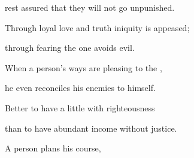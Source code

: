 {\par }{\Q rest assured
that they will not
go unpunished.
\par }{\Q {}Through loyal love
and truth
iniquity
is appeased;
\par }{\Q through fearing
the {}
one avoids
evil.
\par }{\Q {}When a person’s
ways
are pleasing
to the
{},

\par }{\Q he even
reconciles
his enemies
to himself.
\par }{\Q {}Better
to have a little
with righteousness
\par }{\Q than to have abundant
income
without
justice.
\par }{\Q {}A person
plans
his course,

}
